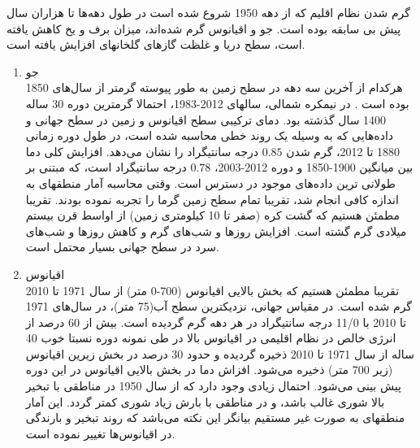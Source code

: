 	گرم شدن نظام اقلیم که از دهه 1950 شروع شده است در طول دهه‌ها تا هزاران سال پیش بی سابقه بوده است. جو و اقیانوس گرم شده‌اند، میزان برف و یخ کاهش یافته است، سطح دریا و غلظت گازهای گلخانهای افزایش یافته است.
	
	
	
	
	
	\begin{enumerate}
		
		
		
		
		
		
		
		
		\item  جو\\
		هرکدام از آخرین سه دهه در سطح زمین به طور پیوسته گرمتر از سال‌های 1850 بوده است . در نیمکره شمالی، سالهای 2012-1983، احتمالا گرمترین دوره 30 ساله 1400 سال گذشته بود. دمای ترکیبی سطح اقیانوس و  زمین در سطح جهانی و داده‌هایی که به وسیله یک روند خطی محاسبه شده است، در طول دوره زمانی 1880 تا 2012، گرم شدن $ 0.85 $ درجه سانتیگراد را نشان می‌دهد. افزایش کلی دما بین میانگین 1900-1850 و دوره 2012-2003، $ 0.78 $ درجه سانتیگراد است، که مبتنی بر طولانی ترین داده‌های موجود در دسترس است. وقتی محاسبه آمار منطقهای به‌ اندازه  کافی انجام شد، تقریبا تمام سطح زمین گرما را تجربه نموده بودند. تقریبا مطمئن هستیم که گشت کره  (صفر تا 10 کیلومتری زمین) از اواسط قرن بیستم میلادی گرم گشته است. افزایش روز‌ها و شب‌های گرم و کاهش روز‌ها و شب‌های سرد در سطح جهانی بسیار محتمل است.
		
		
		
		
		
		
		
		
		
		
		
		
		
		
		
		
		\item	 اقیانوس\\
		تقریبا مطمئن هستیم که بخش بالایی اقیانوس (700-0 متر) از سال 1971 تا 2010 گرم شده است. در مقیاس جهانی، نزدیکترین سطح آب(75 متر)، در سال‌های 1971 تا 2010 با 11/0 درجه سانتیگراد در هر دهه گرم گردیده است. بیش از 60 درصد از انرژی خالص در نظام اقلیمی در اقیانوس بالا در طی نمونه دوره نسبتا خوب 40 ساله از سال 1971 تا 2010 ذخیره گردیده و حدود 30 درصد در بخش زیرین اقیانوس (زیر 700 متر) ذخیره می‌شود. افزاش دما در بخش بالایی اقیانوس در این دوره پیش بینی می‌شود. احتمال زیادی وجود دارد که از سال 1950 در مناطقی با تبخیر بالا شوری غالب باشد، و در مناطقی با بارش زیاد شوری کمتر گردد. این آمار منطقهای به صورت غیر مستقیم بیانگر این نکته می‌باشد که روند تبخیر و بارندگی در اقیانوس‌ها تغییر نموده است.
		

\end{enumerate}
